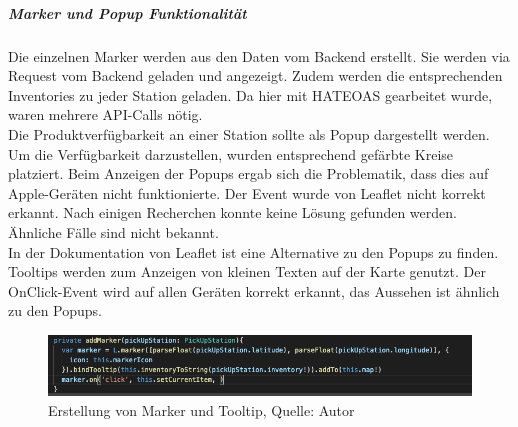 \subparagraph{Marker und Popup Funktionalität}
Die einzelnen Marker werden aus den Daten vom Backend erstellt. Sie werden via Request vom Backend geladen und angezeigt. Zudem werden die entsprechenden Inventories zu jeder Station geladen. Da hier mit \ac{HATEOAS} gearbeitet wurde, waren mehrere \ac{API}-Calls nötig.  \\
Die Produktverfügbarkeit an einer Station sollte als Popup dargestellt werden. Um die Verfügbarkeit darzustellen, wurden entsprechend gefärbte Kreise platziert.  
Beim Anzeigen der Popups ergab sich die Problematik, dass dies auf Apple-Geräten nicht funktionierte. Der Event wurde von Leaflet nicht korrekt erkannt. Nach einigen Recherchen konnte keine Lösung gefunden werden. Ähnliche Fälle sind nicht bekannt. \\
In der Dokumentation von Leaflet ist eine Alternative zu den Popups zu finden. Tooltips werden zum Anzeigen von kleinen Texten auf der Karte genutzt. Der OnClick-Event wird auf allen Geräten korrekt erkannt, das Aussehen ist ähnlich zu den Popups. 
\begin{figure}[H]
	\centering
	\includegraphics[width=1\textwidth]{images/tooltipImp.PNG}
	\caption[Erstellung von Marker und Tooltip]{Erstellung von Marker und Tooltip, Quelle: Autor}
	\label{img: tooltip}
\end{figure} 

